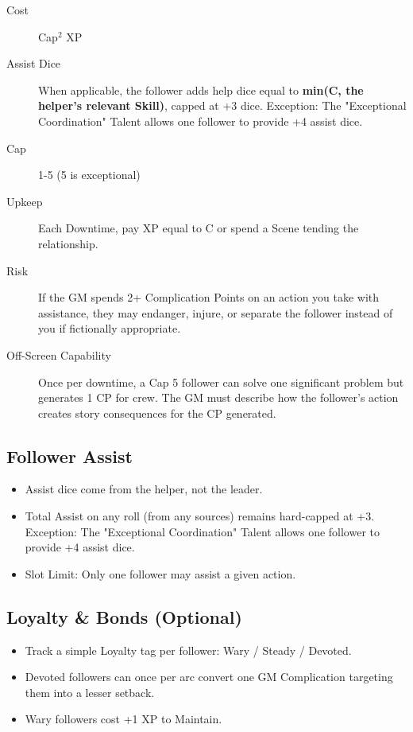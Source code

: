 \begin{description}
\item[Cost] Cap$^2$ XP
\item[Assist Dice] When applicable, the follower adds help dice equal to \textbf{min(C, the helper's relevant Skill)}, capped at +3 dice. Exception: The "Exceptional Coordination" Talent allows one follower to provide +4 assist dice.
\item[Cap] 1-5 (5 is exceptional)
\item[Upkeep] Each Downtime, pay XP equal to C or spend a Scene tending the relationship.
\item[Risk] If the GM spends 2+ Complication Points on an action you take with assistance, they may endanger, injure, or separate the follower instead of you if fictionally appropriate.
\item[Off-Screen Capability] Once per downtime, a Cap 5 follower can solve one significant problem but generates 1 CP for crew. The GM must describe how the follower's action creates story consequences for the CP generated.
\end{description}

\subsection{Follower Assist}
\begin{itemize}
    \item Assist dice come from the helper, not the leader.
    \item Total Assist on any roll (from any sources) remains hard-capped at +3. Exception: The "Exceptional Coordination" Talent allows one follower to provide +4 assist dice.
    \item Slot Limit: Only one follower may assist a given action.
\end{itemize}

\subsection{Loyalty \& Bonds (Optional)}
\begin{itemize}
    \item Track a simple Loyalty tag per follower: Wary / Steady / Devoted.
    \item Devoted followers can once per arc convert one GM Complication targeting them into a lesser setback.
    \item Wary followers cost +1 XP to Maintain.
\end{itemize}

